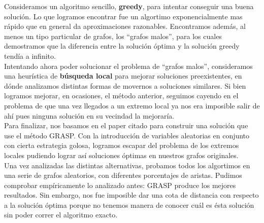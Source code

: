 Consideramos un algoritmo sencillo, \textbf{greedy}, para intentar conseguir una buena solución. Lo que logramos encontrar fue un algortimo exponencialmente mas rápido que en general da aproximaciones razonables. Encontramos además, al menos un tipo particular de grafos, los ``grafos malos'', para los cuales demostramos que la diferencia entre la solución óptima y la solución greedy tendía a infinito. \\

Intentando ahora poder solucionar el problema de ``grafos malos'', consideramos una heurística de \textbf{búsqueda local} para mejorar soluciones preexistentes, en dónde analizamos distintas formas de movernos a soluciones similares. Si bien logramos mejorar, en ocasiones, el método anterior, seguimos cayendo en el problema de que una vez llegados a un extremo local ya nos era imposible salir de ahí pues ninguna solución en su vecindad la mejoraría. \\

Para finalizar, nos basamos en el paper citado \cite{paper_grasp} para construir una solución que use el método GRASP. Con la introducción de variables aleatorias en conjunto con cierta estrategia golosa, logramos escapar del problema de los extremos locales pudiendo lograr así soluciones óptimas en nuestros grafos originales.  \\

Una vez analizadas las distintas alternativas, probamos todos los algortimos en una serie de grafos aleatorios, con diferentes porcentajes de aristas. Pudimos comprobar empíricamente lo analizado antes: GRASP produce los mejores resultados. Sin embargo, nos fue imposible dar una cota de distancia con respecto a la solución óptima porque no tenemos manera de conocer cuál es ésta solución sin poder correr el algoritmo exacto. \\

